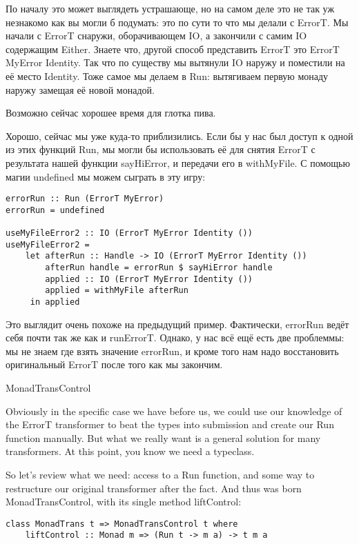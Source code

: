 По началу это может выглядеть устрашающе, но на самом деле это не так уж незнакомо как вы могли б подумать: это по сути то что мы делали с ErrorT. Мы начали с ErrorT снаружи, оборачивающем IO, а закончили с самим IO содержащим Either. Знаете что, другой способ представить ErrorT это ErrorT MyError Identity. Так что по существу мы вытянули IO наружу и поместили на её место Identity. Тоже самое мы делаем в Run: вытягиваем первую монаду наружу замещая её новой монадой.

Возможно сейчас хорошее время для глотка пива.

Хорошо, сейчас мы уже куда-то приблизились. Если бы у нас был доступ к одной из этих функций Run, мы могли бы использовать её для снятия ErrorT с результата нашей функции sayHiError, и передачи его в withMyFile. С помощью магии undefined мы можем сыграть в эту игру:

\begin{lstlisting}
errorRun :: Run (ErrorT MyError)
errorRun = undefined

useMyFileError2 :: IO (ErrorT MyError Identity ())
useMyFileError2 =
    let afterRun :: Handle -> IO (ErrorT MyError Identity ())
        afterRun handle = errorRun $ sayHiError handle
        applied :: IO (ErrorT MyError Identity ())
        applied = withMyFile afterRun
     in applied
\end{lstlisting}

Это выглядит очень похоже на предыдущий пример. Фактически, errorRun ведёт себя почти так же как и runErrorT. Однако, у нас всё ещё есть две проблеммы: мы не знаем где взять значение errorRun, и кроме того нам надо восстановить оригинальный ErrorT после того как мы закончим.

MonadTransControl

Obviously in the specific case we have before us, we could use our knowledge of the ErrorT transformer to beat the types into submission and create our Run function manually. But what we really want is a general solution for many transformers. At this point, you know we need a typeclass.

So let's review what we need: access to a Run function, and some way to restructure our original transformer after the fact. And thus was born MonadTransControl, with its single method liftControl:

\begin{lstlisting}
class MonadTrans t => MonadTransControl t where
    liftControl :: Monad m => (Run t -> m a) -> t m a
\end{lstlisting}

